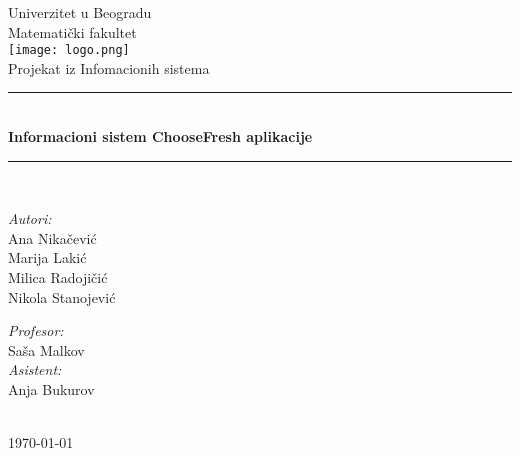 \begin{titlepage}


\newcommand{\HRule}{\rule{\linewidth}{0.5mm}}
\center
\textup{\Large Univerzitet u Beogradu\\Matemati\v cki fakultet}\\[1.5cm]
\texttt{[image: logo.png]}\\[1cm]
\textup{\Large Projekat iz Infomacionih sistema}\\[0.4cm]

\HRule \\[0.4cm]
{ \huge \bfseries Informacioni sistem ChooseFresh aplikacije}\\[0.4cm]
\HRule \\[4.5cm]

\begin{minipage}{0.4\textwidth}
\begin{flushleft}
\large
\emph{Autori:}\\
\textup Ana Nikačević\\
\textup Marija Lakić\\
\textup Milica Radojičić\\
\textup Nikola Stanojević\\

\end{flushleft}
\end{minipage}
\hfill
\begin{minipage}{0.4\textwidth}
\begin{flushright}
\large
\emph{Profesor:} \\
\textup Saša Malkov\\
\emph{Asistent:} \\
\textup Anja Bukurov\\
\end{flushright}
\end{minipage}\\[2cm]


{\textup \large \today}\\[1cm]

\end{titlepage}
